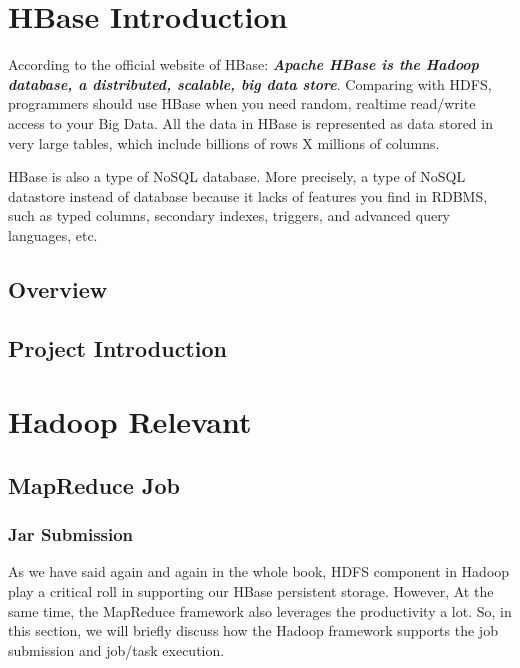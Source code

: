 \documentclass{tufte-book}
\begin{document}
\tableofcontents


\cleardoublepage
\chapter{HBase Introduction}
According to the official website of HBase: \textbf{\textit{Apache
    HBase is the Hadoop database, a distributed, scalable, big data
    store}}. Comparing with HDFS, programmers should use HBase when
you need random, realtime read/write access to your Big Data. All the
data in HBase is represented as data stored in very large tables,
which include billions of rows X millions of columns.

HBase is also a type of NoSQL database. More precisely, a type of
NoSQL datastore instead of database because it lacks of features
you find in RDBMS, such as typed columns, secondary indexes, triggers,
and advanced query languages, etc.

\section{Overview}


\section{Project Introduction}


\chapter{Hadoop Relevant}

\section{MapReduce Job}

\subsection{Jar Submission}

As we have said again and again in the whole book, HDFS component in
Hadoop play a critical roll in supporting our HBase persistent
storage. However, At the same time, the MapReduce 
framework also leverages the productivity a lot. So, in this section, we will
briefly discuss how the Hadoop framework supports the job submission
and job/task execution.
\end{document}
